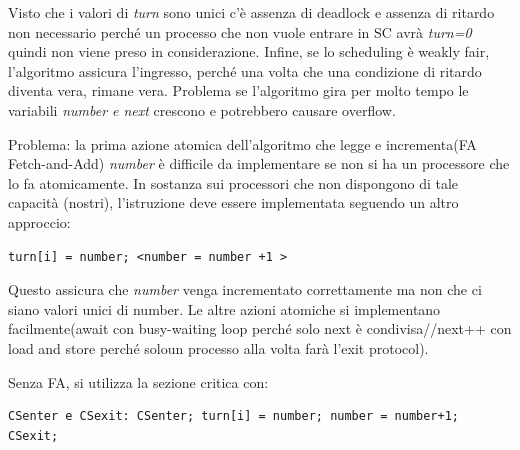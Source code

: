 \documentclass[10pt,a4paper]{article}
\begin{document}
Visto che i valori di \textit{turn} sono unici c'è assenza di deadlock e assenza di ritardo non necessario perché un processo che non vuole entrare in SC avrà \textit{turn=0} quindi non viene preso in considerazione.
Infine, se lo scheduling è weakly fair, l'algoritmo assicura l'ingresso, perché una volta che una condizione di ritardo diventa vera, rimane vera.
Problema se l'algoritmo gira per molto tempo le variabili \textit{number e next} crescono e potrebbero causare overflow.

Problema: la prima azione atomica dell'algoritmo che legge e incrementa(FA Fetch-and-Add) \textit{number} è difficile da implementare se non si ha un processore che lo fa atomicamente. In sostanza sui processori che non dispongono di tale capacità (nostri), l'istruzione deve essere implementata seguendo un altro approccio: \begin{verbatim}
turn[i] = number; <number = number +1 >
\end{verbatim} 
Questo assicura che \textit{number} venga incrementato correttamente ma non che ci siano valori unici di number.
Le altre azioni atomiche si implementano facilmente(await con busy-waiting loop perché solo next è condivisa//next++ con load and store perché soloun processo alla volta farà l'exit protocol).

Senza FA, si utilizza la sezione critica con: \begin{verbatim}CSenter e CSexit: CSenter; turn[i] = number; number = number+1; CSexit;\end{verbatim}
\end{document}
